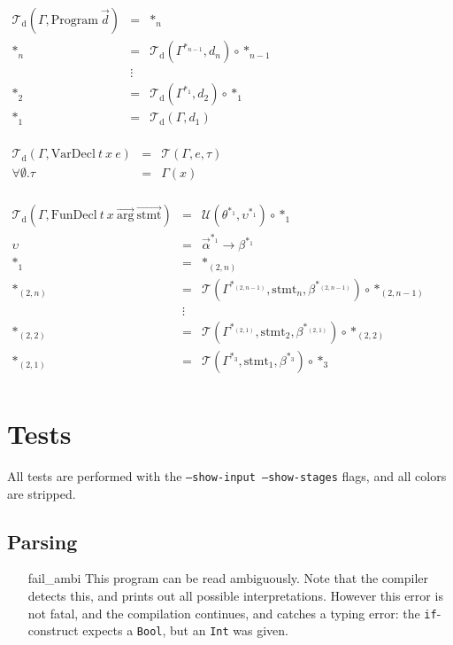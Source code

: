 \documentclass[14pt]{amsart}
\begin{document}
\newcommand{\T}{\mathcal{T}}
\newcommand{\U}{\mathcal{U}}
\newcommand{\s}{\ast}
\newcommand{\sn}[1]{{\s_{#1}}}

	
$\begin{array}{rcl}
	\T_{\mbox{d}}(\Gamma, \mbox{Program}~\vec{d}) & = & \s_n \\
	\sn{n} & = & \T_{\mbox{d}}(\Gamma^{\sn{n-1}}, d_n) \circ \sn{n-1} \\
	& \vdots & \\
	\sn{2} & = & \T_{\mbox{d}}(\Gamma^{\sn{1}}, d_2) \circ \sn{1} \\
	\sn{1} & = & \T_{\mbox{d}}(\Gamma, d_1) \\
\end{array}$

$\begin{array}{rcl}
	\T_{\mbox{d}}(\Gamma, \mbox{VarDecl}~t~x~e) & = & \T(\Gamma, e, \tau) \\
	\forall \emptyset . \tau	& = & \Gamma(x) \\
\end{array}$

$\begin{array}{rcl}
	\T_{\mbox{d}}(\Gamma, \mbox{FunDecl}~t~x~\vec{\mbox{arg}}~\vec{\mbox{stmt}}) & = & \U(\theta^\sn{1}, \upsilon^\sn{1}) \circ \sn{1} \\
	\upsilon	& = & \vec{\alpha}^\sn{1} \rightarrow \beta^\sn{1} \\
	\sn{1}		& = & \sn{(2,n)} \\
	\sn{(2,n)}	& = & \T(\Gamma^\sn{(2,n-1)}, \mbox{stmt}_n, \beta^\sn{(2,n-1)}) \circ \sn{(2,n-1)} \\
	& \vdots & \\
	\sn{(2,2)}	& = & \T(\Gamma^\sn{(2,1)}, \mbox{stmt}_2, \beta^\sn{(2,1)}) \circ \sn{(2,2)} \\
	\sn{(2,1)}	& = & \T(\Gamma^\sn{3}, \mbox{stmt}_1, \beta^\sn{3}) \circ \sn{3} \\
	
	
\end{array}$



\section{Tests}
All tests are performed with the \texttt{--show-input --show-stages} flags, and all colors are stripped.
\subsection{Parsing}
\begin{itemize}
	\item[fail\_ambi] This program can be read ambiguously. Note that the compiler detects this, and prints out all possible interpretations. However this error is not fatal, and the compilation continues, and catches a typing error: the \texttt{if}-construct expects a \texttt{Bool}, but an \texttt{Int} was given.
\end{itemize}
\end{document}
